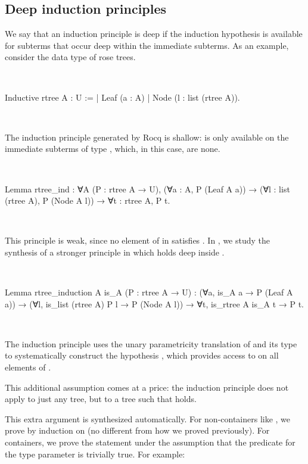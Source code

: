 \documentclass[a4paper, 11pt]{book}
\newenvironment{rocqcode}
  {\VerbatimEnvironment~\\\begin{rocqbox}\begin{xrocqcode}}{\end{xrocqcode}
\end{rocqbox}\\}
\begin{document}
\subsection{Deep induction principles}


We say that an induction principle is deep if the induction hypothesis is
available for subterms that occur deep within the immediate subterms. As an
example, consider the data type of rose trees.

\begin{rocqcode}
Inductive rtree A : U :=
| Leaf (a : A)
| Node (l : list (rtree A)).
\end{rocqcode}

The induction principle generated by Rocq is shallow:  is only
available on the immediate subterms of type , which, in this case,
are none.

\begin{rocqcode}
Lemma rtree_ind : ∀A (P : rtree A → U),
  (∀a : A, P (Leaf A a)) →
  (∀l : list (rtree A), P (Node A l)) →
  ∀t : rtree A, P t.
\end{rocqcode}

This principle is weak, since no element of  in 
satisfies . In \cite{tassi:hal-01897468}, we study the synthesis of a
stronger principle in which  holds deep inside .

\begin{rocqcode}
Lemma rtree_induction A is_A (P : rtree A → U) :
  (∀a, is_A a → P (Leaf A a)) →
  (∀l, is_list (rtree A) P l → P (Node A l)) →
     ∀t, is_rtree A is_A t → P t.
\end{rocqcode}


The induction principle uses the unary parametricity translation of 
and its type to systematically construct the hypothesis
, which provides access to  on all
elements of .

This additional assumption comes at a price: the induction principle does not
apply to just any tree, but to a tree  such that
 holds.

This extra argument is synthesized
automatically.
For non-containers like , we prove  by induction
on  (no different from how we proved  previously). For
containers, we prove the statement under the assumption that the predicate for
the type parameter is trivially true. For example:
\end{document}
